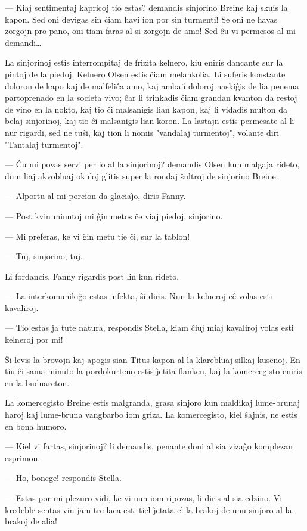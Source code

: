  --- Kiaj sentimentaj kapricoj tio estas? demandis sinjorino Breine kaj
skuis la kapon. Sed oni devigas sin \^ciam havi ion por sin
turmenti! Se oni ne havas zorgojn pro pano, oni tiam faras al si
zorgojn de amo! Sed \^cu vi permesos al mi demandi\dots

   La sinjorinoj estis interrompitaj de frizita kelnero, kiu eniris
dancante sur la pintoj de la piedoj. Kelnero Olsen estis \^ciam
melankolia. Li suferis konstante doloron de kapo kaj de malfeli\^ca
amo, kaj amba\u u doloroj naski\^gis de lia penema partoprenado en
la societa vivo; \^car li trinkadis \^ciam grandan kvanton da restoj
de vino en la nokto, kaj tio \^ci malsanigis lian kapon, kaj li
vidadis multon da belaj sinjorinoj, kaj tio \^ci malsanigis lian
koron. La lastajn estis permesate al li nur rigardi, sed ne tu\^si,
kaj tion li nomis "vandalaj turmentoj", volante diri "Tantalaj
turmentoj".

 --- \^Cu mi povas servi per io al la sinjorinoj? demandis Olsen kun
malgaja rideto, dum liaj akvobluaj okuloj glitis super la rondaj
\^sultroj de sinjorino Breine.

 --- Alportu al mi porcion da glacia\^{\j}o, diris Fanny.

 --- Post kvin minutoj mi \^gin metos \^ce viaj piedoj, sinjorino.

 --- Mi preferas, ke vi \^gin metu tie \^ci, sur la tablon!

 --- Tuj, sinjorino, tuj.

   Li fordancis. Fanny rigardis post lin kun rideto.

 --- La interkomuniki\^go estas infekta, \^si diris. Nun la kelneroj e\^c
volas esti kavaliroj.

 --- Tio estas ja tute natura, respondis Stella, kiam \^ciuj miaj
kavaliroj volas esti kelneroj por mi!

   \^Si levis la brovojn kaj apogis sian Titus-kapon al la klarebluaj
silkaj kusenoj. En tiu \^ci sama minuto la pordokurteno estis
\^{\j}etita flanken, kaj la komercegisto eniris en la buduareton.

   La komercegisto Breine estis malgranda, grasa sinjoro kun maldikaj
lume-brunaj haroj kaj lume-bruna vangbarbo iom griza. La
komercegisto, kiel \^sajnis, ne estis en bona humoro.

 --- Kiel vi fartas, sinjorinoj? li demandis, penante doni al sia
viza\^go komplezan esprimon.

 --- Ho, bonege! respondis Stella.

 --- Estas por mi plezuro vidi, ke vi nun iom ripozas, li diris al sia
edzino. Vi kredeble sentas vin jam tre laca esti tiel \^{\j}etata el
la brakoj de unu sinjoro al la brakoj de alia!

